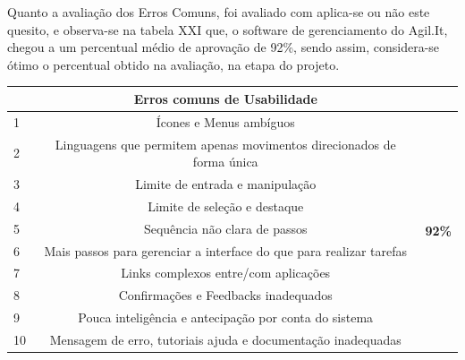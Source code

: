 Quanto a avaliação dos Erros Comuns, foi avaliado com aplica-se ou não este quesito, e observa-se na tabela XXI que, o software de gerenciamento do Agil.It, chegou a um percentual médio de aprovação de 92\%, sendo assim, considera-se ótimo o percentual obtido na avaliação, na etapa do projeto.

\begin{table}[]
	\begin{tabular}{|l|c|l|l|l|l|l|}
		\hline
		& \multicolumn{5}{c|}{\textbf{Erros   comuns de Usabilidade}}                                  &                                 \\ \hline
		1                        & \multicolumn{5}{c|}{Ícones   e Menus ambíguos}                                               & \multirow{10}{*}{\textbf{92\%}} \\ \cline{1-6}
		2                        & \multicolumn{5}{c|}{Linguagens   que permitem apenas movimentos direcionados de forma única} &                                 \\ \cline{1-6}
		3                        & \multicolumn{5}{c|}{Limite   de entrada e manipulação}                                       &                                 \\ \cline{1-6}
		4                        & \multicolumn{5}{c|}{Limite   de seleção e destaque}                                          &                                 \\ \cline{1-6}
		5                        & \multicolumn{5}{c|}{Sequência   não clara de passos}                                         &                                 \\ \cline{1-6}
		6                        & \multicolumn{5}{c|}{Mais   passos para gerenciar a interface do que para realizar tarefas}   &                                 \\ \cline{1-6}
		7                        & \multicolumn{5}{c|}{Links   complexos entre/com aplicações}                                  &                                 \\ \cline{1-6}
		8                        & \multicolumn{5}{c|}{Confirmações   e Feedbacks inadequados}                                  &                                 \\ \cline{1-6}
		9                        & \multicolumn{5}{c|}{Pouca   inteligência e antecipação por conta do sistema}                 &                                 \\ \cline{1-6}
		10                       & \multicolumn{5}{c|}{Mensagem   de erro, tutoriais ajuda e documentação inadequadas}          &                                 \\ \hline

\end{tabular}
\end{table}
